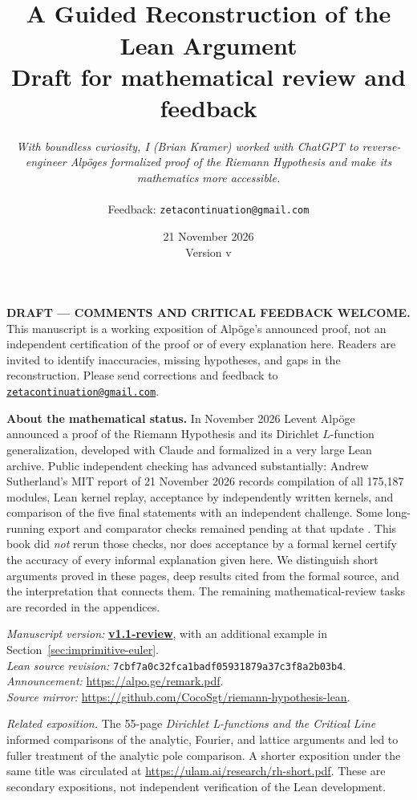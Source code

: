 \documentclass[11pt,openany,oneside]{scrbook}
\title{\vspace{-1.3cm}{\LARGE\bfseries Unpacking Alp\"oge's Proof\\Of the Riemann Hypothesis}\\[.7em]{\Large A Guided Reconstruction of the Lean Argument}\\[1.2em]{\normalsize Draft for mathematical review and feedback}}
\author{\parbox{.78\textwidth}{\centering\small\itshape With boundless curiosity, I (Brian Kramer) worked with ChatGPT to reverse-engineer Alp\"oge\textquotesingle s formalized proof of the Riemann Hypothesis and make its mathematics more accessible.}\\[2.1em]\small Feedback: \texttt{zetacontinuation@gmail.com}}
\date{21 November 2026\\[.5em]\small Version v\manuscriptversion}
\theoremstyle{definition}
\theoremstyle{remark}
\newcommand{\manuscriptversion}{1.1-review}
\begin{document}
\frontmatter
\maketitle
\thispagestyle{empty}
\vspace*{1.2cm}
\noindent\textbf{DRAFT --- COMMENTS AND CRITICAL FEEDBACK WELCOME.} This manuscript is a working exposition of Alp\"oge's announced proof, not an independent certification of the proof or of every explanation here. Readers are invited to identify inaccuracies, missing hypotheses, and gaps in the reconstruction. Please send corrections and feedback to \href{mailto:zetacontinuation@gmail.com}{\texttt{zetacontinuation@gmail.com}}.

\medskip
\noindent\textbf{About the mathematical status.} In November 2026 Levent Alp\"oge announced a proof of the Riemann Hypothesis and its Dirichlet $L$-function generalization, developed with Claude and formalized in a very large Lean archive. Public independent checking has advanced substantially: Andrew Sutherland's MIT report of 21 November 2026 records compilation of all 175,187 modules, Lean kernel replay, acceptance by independently written kernels, and comparison of the five final statements with an independent challenge. Some long-running export and comparator checks remained pending at that update \parencite{Sutherland2026Verification}. This book did \emph{not} rerun those checks, nor does acceptance by a formal kernel certify the accuracy of every informal explanation given here. We distinguish short arguments proved in these pages, deep results cited from the formal source, and the interpretation that connects them. The remaining mathematical-review tasks are recorded in the appendices.

\medskip
\noindent\textit{Manuscript version:} \href{https://doi.org/10.5281/zenodo.24433694}{\textbf{v\manuscriptversion}}, with an additional example in Section~\ref{sec:imprimitive-euler}.\\
\textit{Lean source revision:} \texttt{7cbf7a0c32fca1badf05931879a37c3f8a2b03b4}.\\
\textit{Announcement:} \url{https://alpo.ge/remark.pdf}.\\
\textit{Source mirror:} \url{https://github.com/CocoSgt/riemann-hypothesis-lean}.

\medskip
\noindent\textit{Related exposition.} The 55-page \emph{Dirichlet L-functions and the Critical Line} informed comparisons of the analytic, Fourier, and lattice arguments and led to fuller treatment of the analytic pole comparison. A shorter exposition under the same title was circulated at \url{https://ulam.ai/research/rh-short.pdf}. These are secondary expositions, not independent verification of the Lean development.
\clearpage
\end{document}
